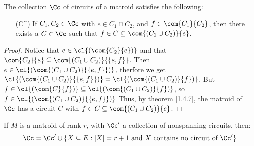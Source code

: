 \begin{theorem}\label{1.4.8}
    The collection $\Cc$ of circuits of a matroid satisfies the following:
    \begin{enumerate}
        \item[(C^\prime3)] If $C_1,C_2 \in \Cc$ with $e \in C_1 \cap C_2$, and $f
            \in \com{C_1}{C_2}$, then there exists a $C \in \Cc$ such that  $f
            \in C \subseteq \com{(C_1 \cup C_2)}{e}$.
    \end{enumerate}
\end{theorem}
\begin{proof}
    Notice that $e \in \cl{(\com{C_2}{e})}$ and that $\com{C_2}{e} \subseteq
    \com{(C_1 \cup C_2)}{\{e,f\}}$. Then $e \in \cl{(\com{(C_1 \cup
    C_2)}{\{e,f\}})}$, therfore we get $\cl{(\com{(C_1 \cup
C_2)}{\{e,f\}})}=\cl{(\com{(C_1 \cup C_2)}{f})}$. But $f \in \cl{(\com{C}{f})}
\subseteq \cl{(\com{(C_1 \cup C_2)}{f})}$, so $f \in
\cl{(\com{(C_1 \cup C_2)}{\{e,f\}})}$ Thus, by theorem \ref{1.4.7}, the matroid
of $\Cc$ has a circuit $C$ with $f \in C \subseteq \com{(C_1 \cup C_2)}{e}$.
\end{proof}

\begin{theorem}\label{1.4.9}
    If $M$ is a matroid of rank $r$, with $\Cc'$ a collection of nonspanning
    circuits, then:
    \begin{equation*}
        \Cc=\Cc' \cup \{X \subseteq E : |X|=r+1 \text{ and }  X \text{ contains
        no circuit of } \Cc'\}
    \end{equation*}
\end{theorem}

